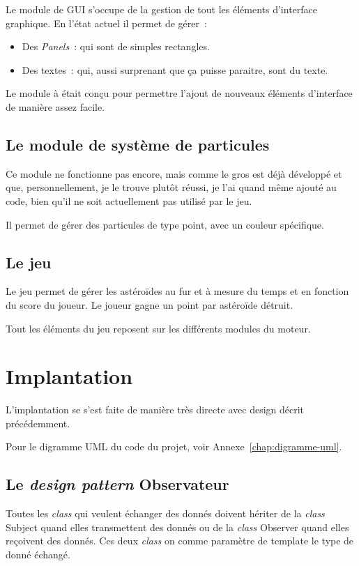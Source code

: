 \documentclass[10pt, french, a4paper]{report}
\newcommand{\class}[1]{{\codefont \NoAutoSpacing \mbox{#1}}}
\begin{document}
Le module de GUI s'occupe de la gestion de tout les éléments d'interface graphique.
En l'état actuel il permet de gérer~:
\begin{itemize}
	\item Des \textit{Panels}~: qui sont de simples rectangles.
	\item Des textes~: qui, aussi surprenant que ça puisse paraitre, sont du texte.
\end{itemize}

Le module à était conçu pour permettre l'ajout de nouveaux éléments d'interface de 
manière assez facile. 

\section{Le module de système de particules}

Ce module ne fonctionne pas encore, mais comme le gros est déjà développé et que, 
personnellement, je le trouve plutôt réussi, je l'ai quand même ajouté au code, bien
qu'il ne soit actuellement pas utilisé par le jeu.

Il permet de gérer des particules de type point, avec un couleur spécifique.

\section{Le jeu}

Le jeu permet de gérer les astéroïdes au fur et à mesure du temps et en fonction 
du score du joueur. 
Le joueur gagne un point par astéroïde détruit. 

Tout les éléments du jeu reposent sur les différents modules du moteur.


\chapter{Implantation}

L'implantation se s'est faite de manière très directe avec design décrit précédemment.

Pour le digramme UML du code du projet, voir Annexe~\ref{chap:digramme-uml}.

\section{Le \textit{design pattern} Observateur}

Toutes les \textit{class} qui veulent échanger des donnés doivent hériter de la 
\textit{class} \class{Subject} quand elles transmettent des donnés ou de la 
\textit{class} \class{Observer} quand elles reçoivent des donnés. Ces deux \textit{class} on comme paramètre de template le type de donné échangé.
\end{document}

